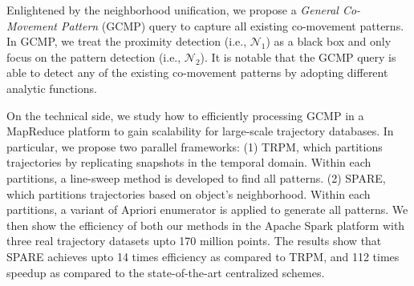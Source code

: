 Enlightened by the neighborhood unification, we propose a \emph{General Co-Movement Pattern} (GCMP)
query to capture all existing co-movement patterns. In GCMP, we treat the proximity detection (i.e., $\mathcal{N}_1$) as
a black box and only focus on the pattern detection (i.e., $\mathcal{N}_2$). It is notable that the GCMP
query is able to detect any of the existing co-movement patterns by adopting different analytic functions.




On the technical side, we study how to efficiently processing GCMP in a MapReduce platform to gain scalability for large-scale trajectory databases. In particular, we propose two parallel frameworks: (1) TRPM, which partitions trajectories by replicating snapshots in the temporal domain. Within each partitions, a line-sweep method is developed to find all patterns. (2) SPARE, which partitions trajectories based on object's neighborhood. Within each partitions, a variant of Apriori enumerator is applied to generate all patterns. We then show the efficiency of both our methods in the Apache Spark platform with three real trajectory datasets upto 170 million points. The results show that SPARE achieves upto 14 times efficiency as compared to TRPM, and 112 times speedup as compared to the state-of-the-art centralized schemes.